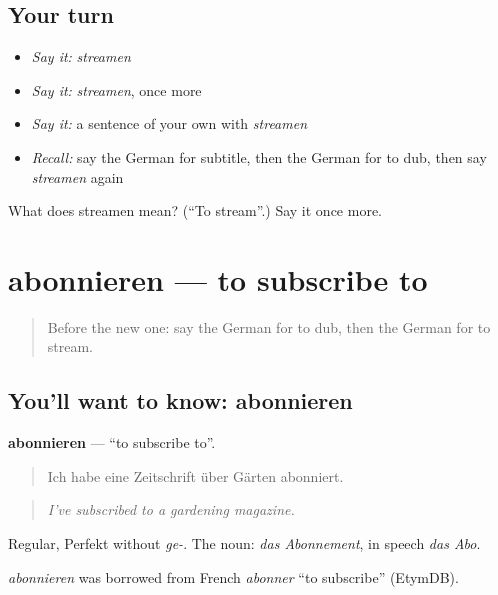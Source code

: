 \subsection*{Your turn}
\begin{itemize}
\raggedright
  \item \emph{Say it:} \emph{streamen}
  \item \emph{Say it:} \emph{streamen}, once more
  \item \emph{Say it:} a sentence of your own with \emph{streamen}
  \item \emph{Recall:} say the German for subtitle, then the German for to dub, then say \emph{streamen} again
\end{itemize}

\begin{tcolorbox}[breakable,colback=teal!4,colframe=teal!35!black,title={Before you move on}]
What does streamen mean? (\textquotedblleft{}To stream\textquotedblright{}.) Say it once more.
\end{tcolorbox}
\section[abonnieren]{abonnieren — to subscribe to}

\label{lesson:GE-C525-abonnieren}



\begin{quote}
Before the new one: say the German for to dub, then the German for to stream.
\end{quote}

\subsection*{You'll want to know: abonnieren}
\textbf{abonnieren} — \textquotedblleft{}to subscribe to\textquotedblright{}.

\begin{quote}
Ich habe eine Zeitschrift über Gärten abonniert.
\end{quote}

\begin{quote}
\emph{I've subscribed to a gardening magazine.}
\end{quote}

Regular, Perfekt without \emph{ge-}. The noun: \emph{das Abonnement}, in speech \emph{das Abo}.

\begin{cousinweb}
\emph{abonnieren} was borrowed from French \emph{abonner} \textquotedblleft{}to subscribe\textquotedblright{} (EtymDB).
\end{cousinweb}

